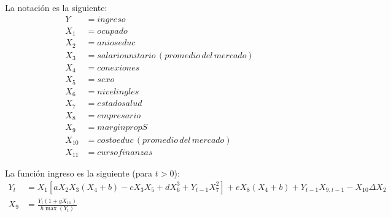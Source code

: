 \documentclass[12pt,letterpaper]{article}
\author{Norman Simón Rodríguez}
\begin{document}
La notación es la siguiente:
\begin{align*}
Y&=ingreso\\
X_1&=ocupado\\
X_2&=anioseduc\\
X_3&=salariounitario \, (promedio\, del\, mercado)\\
X_4&=conexiones\\
X_5&=sexo\\
X_6&=nivelingles\\
X_7&=estadosalud\\
X_8&=empresario\\
X_9&=marginpropS\\
X_{10}&=costoeduc \, (promedio\, del\, mercado)\\
X_{11}&=cursofinanzas
\end{align*}


La función ingreso es la siguiente (para $t>0$):
\begin{align*}
Y_t&=X_1 [ aX_2  X_3  (X_4+b) - cX_3X_5 + dX_6^3 + Y_{t-1}X_7^2] + eX_8  (X_4+b) + Y_{t-1}X_{9, t-1} - X_{10} \Delta X_2\\
X_9&=\frac{Y_t(1+gX_{11})}{h \max(Y_t)}
\end{align*}
\end{document}
